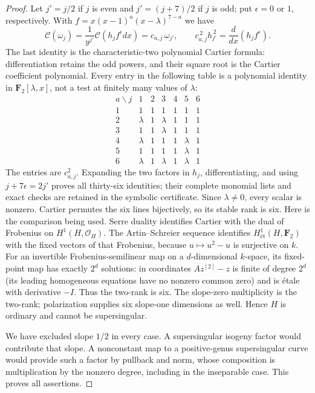 \begin{proof}
Let $j'=j/2$ if $j$ is even and $j'=(j+7)/2$ if $j$ is odd;
put $\epsilon=0$ or $1$, respectively. With
$f=x(x-1)^a(x-\lambda)^{7-a}$ we have
\[
 \mathcal C(\omega_j)
   =\frac1{y^{j'}}\mathcal C(h_jf^\epsilon dx)
   =c_{a,j}\,\omega_{j'},
 \qquad
        c_{a,j}^{\,2}h_{j'}^{\,2}
                   =\frac{d}{dx}(h_jf^\epsilon).              \tag{B.84.4}
\]
The last identity is the characteristic-two polynomial Cartier
formula: differentiation retains the odd powers, and their square
root is the Cartier coefficient polynomial. Every entry in the
following table is a polynomial identity in $\mathbf F _2[\lambda,x]$,
not a test at finitely many values of $\lambda$:
\[
\begin{array}{c|cccccc}
a\backslash j&1&2&3&4&5&6\\ \hline
1&1&1&1&1&1&1\\
2&\lambda&1&\lambda&1&1&1\\
3&1&1&\lambda&1&1&1\\
4&\lambda&1&1&1&\lambda&1\\
5&1&1&1&1&\lambda&1\\
6&\lambda&1&\lambda&1&\lambda&1
\end{array}                                                   \tag{B.84.5}
\]
The entries are $c_{a,j}^2$. Expanding the two factors in $h_j$,
differentiating, and using $j+7\epsilon=2j'$ proves all thirty-six
identities; their complete monomial lists and exact checks are
retained in the symbolic certificate. Since $\lambda\ne0$, every
scalar is nonzero. Cartier permutes the six lines bijectively, so
its stable rank is six. Here is the comparison being used. Serre duality
identifies Cartier with the dual of Frobenius on $H^1(H,\mathcal O_H)$.
The Artin--Schreier sequence identifies
$H^1_{\text{ét}}(H,\mathbf F _2)$ with the fixed vectors of
that Frobenius, because $u\mapsto u^2-u$ is surjective on $k$.
For an invertible Frobenius-semilinear map on a $d$-dimensional
$k$-space, its fixed-point map has exactly $2^d$ solutions:
in coordinates $A z^{[2]}-z$ is finite of degree $2^d$ (its leading
homogeneous equations have no nonzero common zero) and is \'etale
with derivative $-I$. Thus the two-rank is six. The slope-zero
multiplicity is the two-rank; polarization supplies six slope-one
dimensions as well. Hence $H$ is ordinary and cannot be supersingular.

We have excluded slope $1/2$ in every case. A supersingular isogeny
factor would contribute that slope. A nonconstant map to a
positive-genus supersingular curve would provide such a factor by
pullback and norm, whose composition is multiplication by the
nonzero degree, including in the inseparable case. This proves
all assertions.
\end{proof}

